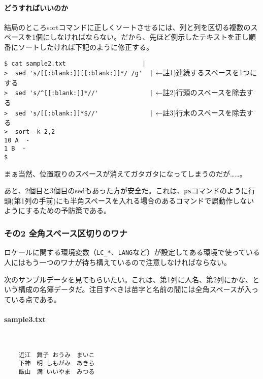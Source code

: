 \paragraph{どうすればいいのか}
結局のところsortコマンドに正しくソートさせるには、列と列を区切る複数のスペースを1個にしなければならない。だから、先ほど例示したテキストを正し順番にソートしたければ下記のように修正する。

\begin{screen}
	\verb!$ cat sample2.txt                     |! \return \\
	\verb!>  sed 's/[[:blank:]][[:blank:]]*/ /g'  |! \return  ←註1)連続するスペースを1つにする \\
	\verb!>  sed 's/^[[:blank:]]*//'              |! \return  ←註2)行頭のスペースを除去する \\
	\verb!>  sed 's/[[:blank:]]*$//'              |! \return  ←註3)行末のスペースを除去する \\
	\verb!>  sort -k 2,2! \return \\
	\verb!10 A  -! \\
	\verb!1 B  -! \\
	\verb!$ !
\end{screen}

まぁ当然、位置取りのスペースが消えてガタガタになってしまうのだが……。

あと、2個目と3個目のsedもあった方が安全だ。これは、\verb|ps|コマンドのように行頭(第1列の手前)にも半角スペースを入れる場合のあるコマンドで誤動作しないようにするための予防策である。

\subsubsection*{その2 全角スペース区切りのワナ}

ロケールに関する環境変数（\verb|LC_*|、\verb|LANG|など）が設定してある環境で使っている人にはもう一つのワナが待ち構えているので注意しなければならない。

次のサンプルデータを見てもらいたい。これは、第1列に人名、第2列にかな、という構成の名簿データだ。注目すべきは苗字と名前の間には全角スペースが入っている点である。

\paragraph{sample3.txt} 　\\
\begin{frameboxit}{160.0mm}
\begin{verbatim}
	近江　舞子 おうみ　まいこ
	下神　明 しもがみ　あきら
	飯山　満 いいやま　みつる
\end{verbatim}
\end{frameboxit}

